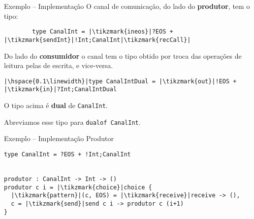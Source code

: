 \begin{frame}[fragile]{Exemplo -- Implementação}
  O canal de comunicação, do lado do \textbf{produtor}, tem o tipo:
  \vspace*{4mm}
  \begin{lstlisting}
        type CanalInt = |\tikzmark{ineos}|?EOS + |\tikzmark{sendInt}|!Int;CanalInt|\tikzmark{recCall}|
\end{lstlisting} 
 
 

 Do lado do \textbf{consumidor} o canal tem o tipo obtido por troca das operações de leitura pelas de escrita, e vice-versa.
\vspace*{4mm} 
\begin{lstlisting}
|\hspace{0.1\linewidth}|type CanalIntDual = |\tikzmark{out}|!EOS + |\tikzmark{in}|?Int;CanalIntDual
\end{lstlisting}


\centering
\begin{tcolorbox}
  O tipo acima é \textbf{dual} de \lstinline|CanalInt|.

  Abreviamos esse tipo para \lstinline|dualof CanalInt|.
\end{tcolorbox}

\end{frame}

\begin{frame}[fragile]{Exemplo -- Implementação  \hfill \color{mLightBrown}Produtor}
  \begin{lstlisting}[xleftmargin=.15\textwidth, xrightmargin=.15\textwidth]
type CanalInt = ?EOS + !Int;CanalInt

    
produtor : CanalInt -> Int -> ()
produtor c i = |\tikzmark{choice}|choice {
  |\tikzmark{pattern}|(c, EOS) = |\tikzmark{receive}|receive -> (),
  c = |\tikzmark{send}|send c i -> produtor c (i+1)
}
  \end{lstlisting}


  
\end{frame}


